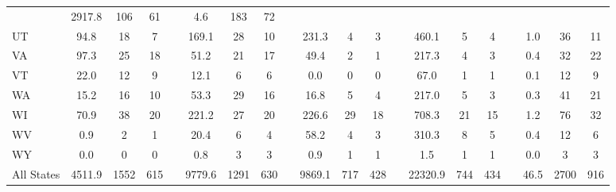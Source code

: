 \documentclass[11pt]{article}
\begin{document}
\begin{table}[t]
\begin{adjustbox}{max width=\textwidth}
\begin{tabular}{l ccc c ccc c ccc c ccc | c ccc}
 & 2917.8 & 106 & 61 & 
 & 4.6 & 183 & 72 \\
 UT & 94.8 & 18 &  7 & 
 & 169.1 & 28 & 10 & 
 & 231.3 &  4 &  3 & 
 & 460.1 &  5 &  4 & 
 & 1.0 & 36 & 11 \\
 VA & 97.3 & 25 & 18 & 
 & 51.2 & 21 & 17 & 
 & 49.4 &  2 &  1 & 
 & 217.3 &  4 &  3 & 
 & 0.4 & 32 & 22 \\
 VT & 22.0 & 12 &  9 & 
 & 12.1 &  6 &  6 & 
 & 0.0 &  0 &  0 & 
 & 67.0 &  1 &  1 & 
 & 0.1 & 12 &  9 \\
 WA & 15.2 & 16 & 10 & 
 & 53.3 & 29 & 16 & 
 & 16.8 &  5 &  4 & 
 & 217.0 &  5 &  3 & 
 & 0.3 & 41 & 21 \\
 WI & 70.9 & 38 & 20 & 
 & 221.2 & 27 & 20 & 
 & 226.6 & 29 & 18 & 
 & 708.3 & 21 & 15 & 
 & 1.2 & 76 & 32 \\
 WV & 0.9 &  2 &  1 & 
 & 20.4 &  6 &  4 & 
 & 58.2 &  4 &  3 & 
 & 310.3 &  8 &  5 & 
 & 0.4 & 12 &  6 \\
 WY & 0.0 &  0 &  0 & 
 & 0.8 &  3 &  3 & 
 & 0.9 &  1 &  1 & 
 & 1.5 &  1 &  1 & 
 & 0.0 &  3 &  3 \\
 \midrule 
  All States  & 4511.9 & 1552 & 615 & 
 & 9779.6 & 1291 & 630 & 
 & 9869.1 & 717 & 428 & 
 & 22320.9 & 744 & 434 & 
 & 46.5 & 2700 & 916 \\
 \midrule 
\bottomrule \bottomrule
\end{tabular}
\end{adjustbox}
\end{table}
\end{document}

